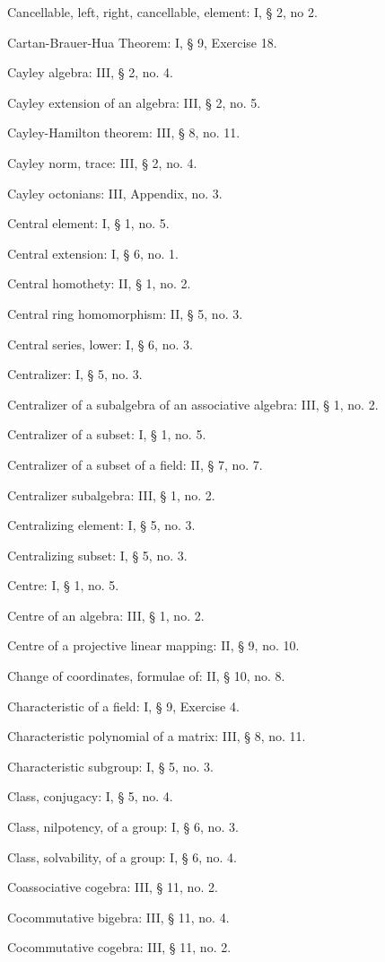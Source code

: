 Cancellable, left, right, cancellable, element: I, § 2, no 2.

Cartan-Brauer-Hua Theorem: I, § 9, Exercise 18.

Cayley algebra: III, § 2, no. 4.

Cayley extension of an algebra: III, § 2, no. 5.

Cayley-Hamilton theorem: III, § 8, no. 11.

Cayley norm, trace: III, § 2, no. 4.

Cayley octonians: III, Appendix, no. 3.

Central element: I, § 1, no. 5.

Central extension: I, § 6, no. 1.

Central homothety: II, § 1, no. 2.

Central ring homomorphism: II, § 5, no. 3.

Central series, lower: I, § 6, no. 3.

Centralizer: I, § 5, no. 3.

Centralizer of a subalgebra of an associative algebra: III, § 1, no. 2.

Centralizer of a subset: I, § 1, no. 5.

Centralizer of a subset of a field: II, § 7, no. 7.

Centralizer subalgebra: III, § 1, no. 2.

Centralizing element: I, § 5, no. 3.

Centralizing subset: I, § 5, no. 3.

Centre: I, § 1, no. 5.

Centre of an algebra: III, § 1, no. 2.

Centre of a projective linear mapping: II, § 9, no. 10.

Change of coordinates, formulae of: II, § 10, no. 8.

Characteristic of a field: I, § 9, Exercise 4.

Characteristic polynomial of a matrix: III, § 8, no. 11.

Characteristic subgroup: I, § 5, no. 3.

Class, conjugacy: I, § 5, no. 4.

Class, nilpotency, of a group: I, § 6, no. 3.

Class, solvability, of a group: I, § 6, no. 4.

Coassociative cogebra: III, § 11, no. 2.

Cocommutative bigebra: III, § 11, no. 4.

Cocommutative cogebra: III, § 11, no. 2.

